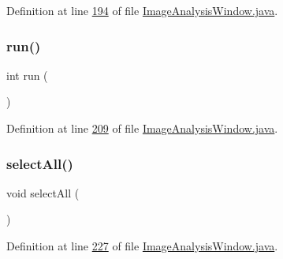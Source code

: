 Definition at line \hyperlink{_image_analysis_window_8java_source_l00194}{194} of file \hyperlink{_image_analysis_window_8java_source}{Image\+Analysis\+Window.\+java}.

\hypertarget{classgui_1_1_image_analysis_window_a58e8be2db2660128e4e6456a9c981fb5}{}\label{classgui_1_1_image_analysis_window_a58e8be2db2660128e4e6456a9c981fb5} 
\subsubsection{\texorpdfstring{run()}{run()}}
{\footnotesize\ttfamily int run (\begin{DoxyParamCaption}{ }\end{DoxyParamCaption})}



Definition at line \hyperlink{_image_analysis_window_8java_source_l00209}{209} of file \hyperlink{_image_analysis_window_8java_source}{Image\+Analysis\+Window.\+java}.

\hypertarget{classgui_1_1_image_analysis_window_ab6658ed404200bd7aaca5629db064645}{}\label{classgui_1_1_image_analysis_window_ab6658ed404200bd7aaca5629db064645} 
\subsubsection{\texorpdfstring{select\+All()}{selectAll()}\hspace{0.1cm}{\footnotesize\ttfamily [1/2]}}
{\footnotesize\ttfamily void select\+All (\begin{DoxyParamCaption}{ }\end{DoxyParamCaption})}



Definition at line \hyperlink{_image_analysis_window_8java_source_l00227}{227} of file \hyperlink{_image_analysis_window_8java_source}{Image\+Analysis\+Window.\+java}.

\hypertarget{classgui_1_1_image_analysis_window_aae663b9e2c200d48d0c146871ef96f6c}{}\label{classgui_1_1_image_analysis_window_aae663b9e2c200d48d0c146871ef96f6c} 
